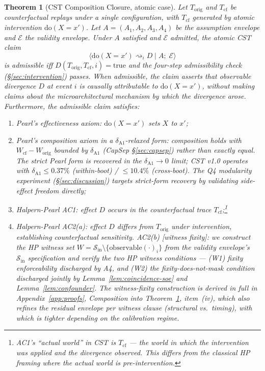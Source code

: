 \documentclass[conference]{IEEEtran}
\newtheorem{theorem}{Theorem}
\newcommand{\Korig}{T_\text{orig}}
\newcommand{\Tcf}{T_\text{cf}}
\newcommand{\dox}[1]{\text{do}(X{=}#1)}
\begin{document}
\begin{theorem}[CST Composition Closure, atomic case]
\label{thm:cst}
Let $\Korig$ and $\Tcf$ be counterfactual replays under a single
configuration, with $\Tcf$ generated by atomic intervention
$\dox{x'}$. Let $A = (A_1, A_2, A_3, A_4)$ be the assumption envelope
and $\mathcal{E}$ the validity envelope. Under $A$ satisfied and
$\mathcal{E}$ admitted, the atomic CST claim
$$\big\langle \dox{x'} \rightsquigarrow_i D \;\big|\;
A;\;\mathcal{E} \big\rangle$$
is \emph{admissible} iff $D(\Korig, \Tcf, i) = \text{true}$ and the
four-step admissibility check (\S\ref{sec:intervention}) passes.
When admissible, the claim asserts that observable divergence $D$ at
event $i$ is causally attributable to $\dox{x'}$, without making
claims about the microarchitectural mechanism by which the
divergence arose. Furthermore, the admissible claim satisfies:
\begin{enumerate}[label=(\roman*)]
\item Pearl's effectiveness axiom: $\dox{x'}$ sets $X$ to $x'$;
\item Pearl's composition axiom in a $\delta_{\text{A1}}$-relaxed
  form: composition holds with $W_\text{cf} - W_\text{orig}$
  bounded by $\delta_{\text{A1}}$ (CapSep \S\ref{sec:capsep}) rather
  than exactly equal. The strict Pearl form is recovered in the
  $\delta_{\text{A1}} \to 0$ limit; CST v1.0 operates with
  $\delta_{\text{A1}} \leq 0.37\%$ (within-boot) /
  $\leq 10.4\%$ (cross-boot). The Q4 modularity experiment
  (\S\ref{sec:discussion}) targets strict-form recovery by
  validating side-effect freedom directly;
\item Halpern-Pearl AC1: effect $D$ occurs in the counterfactual
  trace $\Tcf$;\footnote{AC1's ``actual world'' in CST is $\Tcf$ ---
  the world in which the intervention was applied and the divergence
  observed. This differs from the classical HP framing where the
  actual world is pre-intervention.}
\item Halpern-Pearl AC2(a): effect $D$ differs from $\Korig$ under
  intervention, establishing counterfactual sensitivity. AC2(b)
  [witness fixity]: we construct the HP witness set
  $W = \mathcal{S}_\text{in} \setminus \{\text{observable}(\cdot)_i\}$
  from the validity envelope's $\mathcal{S}_\text{in}$ specification
  and verify the two HP witness conditions --- (W1) fixity
  enforceability discharged by A4, and (W2) the
  fixity-does-not-mask condition discharged jointly by
  Lemma~\ref{lem:coincidence-soe} and
  Lemma~\ref{lem:confounder}. The witness-fixity construction is
  derived in full in Appendix~\ref{app:proofs}, Composition into
  Theorem~\ref{thm:cst}, item~(iv), which also refines the residual
  envelope per witness clause (structural vs.\ timing), with which
  is tighter depending on the calibration regime.
\end{enumerate}
\end{theorem}
\end{document}
